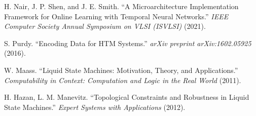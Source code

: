 \begin{thebibliography}{00}

    H. Nair, J. P. Shen, and J. E. Smith.
    ``A Microarchitecture Implementation Framework for Online Learning with Temporal Neural Networks.''
    \textit{IEEE Computer Society Annual Symposium on VLSI (ISVLSI)}
    (2021).

    S. Purdy.
    ``Encoding Data for HTM Systems.''
    \textit{arXiv preprint arXiv:1602.05925}
    (2016).

    W. Maass.
    ``Liquid State Machines: Motivation, Theory, and Applications.''
    \textit{Computability in Context: Computation and Logic in the Real World}
    (2011).

    H. Hazan, L. M. Manevitz.
    ``Topological Constraints and Robustness in Liquid State Machines.''
    \textit{Expert Systems with Applications}
    (2012).

\end{thebibliography}
